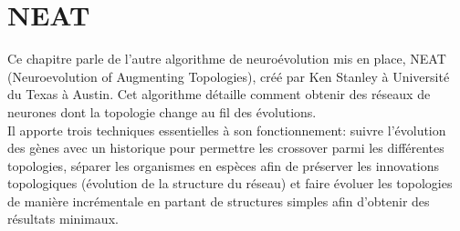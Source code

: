 \documentclass{article}
\begin{document}
\newpage

\section{NEAT}

Ce chapitre parle de l'autre algorithme de neuroévolution mis en place, NEAT (Neuroevolution of Augmenting Topologies), créé par Ken Stanley à Université du Texas à Austin. Cet algorithme détaille comment obtenir des réseaux de neurones dont la topologie change au fil des évolutions.\\
Il apporte trois techniques essentielles à son fonctionnement: suivre l'évolution des gènes avec un historique pour permettre les crossover parmi les différentes topologies, séparer les organismes en espèces afin de préserver les innovations topologiques (évolution de la structure du réseau) et faire évoluer les topologies de manière incrémentale en partant de structures simples afin d'obtenir des résultats minimaux\cite{wikineat}.
\end{document}
